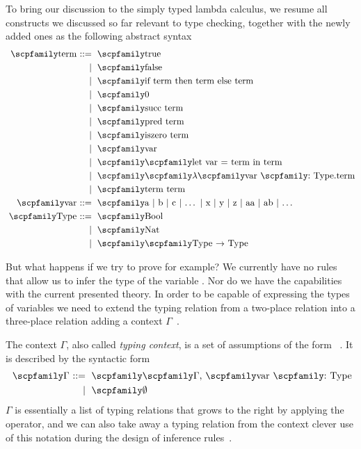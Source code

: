 \documentclass[
  oneside,
  english,
  coorientadorbanca,
  noabntexcite
]{ufsc-thesis-rn46-2019}
\def\bnfdef{::=}
\newcommand{\codett}[1]{\text{\scpfamily#1}}
\newcommand{\code}[1]{\text{\scpfamily\setlength\spaceskip{0.35em}#1}}
\newcommand{\bnfvar}[1]{\codett{#1}}
\newcommand{\bnfmore}[1]{            & \ & \mid{}    & \ \code{#1}}
\newcommand{\astprod}[2]{\code{#1} & \ & \bnfdef{} & \ \code{#2}}
\newcommand{\astmore}[1]{\bnfmore{#1}}
\newcommand{\typer}[2]{\code{#1 \codett{:} #2}}
\newcommand{\fnty}[2]{\code{#1 $\rightarrow$ #2}}
\newcommand{\fnabs}[3]{\code{$\lambda$\typer{#1}{#2}.#3}}
\newcommand{\astlet}[3]{\code{let #1 = #2 in #3}}
\begin{document}
To bring our discussion to the simply typed lambda calculus, we resume all constructs we discussed so far relevant to type checking, together with the newly added ones as the following abstract syntax
\begin{equation}~\label{eq:simply_typed_lc}
  \begin{alignedat}{2}
    \astprod{term}{true} \\
    \astmore{false} \\
    \astmore{if term then term else term} \\
    \astmore{0} \\
    \astmore{succ term} \\
    \astmore{pred term} \\
    \astmore{iszero term} \\
    \astmore{var} \\
    \astmore{\astlet{var}{term}{term}} \\
    \astmore{\fnabs{var}{Type}{term}} \\
    \astmore{term term} \\
    \astprod{var}{a $\mid$ b $\mid$ c $\mid$ $\dots$ $\mid$ x $\mid$ y $\mid$ z $\mid$ aa $\mid$ ab $\mid$ $\dots$} \\
    \astprod{Type}{Bool} \\
    \astmore{Nat} \\
    \astmore{\fnty{Type}{Type}}
  \end{alignedat}
\end{equation}

But what happens if we try to prove \typer{succ a}{Nat} for example?
We currently have no rules that allow us to infer the type of the variable \codett{a}.
Nor do we have the capabilities with the current presented theory.
In order to be capable of expressing the types of variables we need to extend the typing relation from a two-place relation into a three-place relation adding a context $\Gamma$~\cite{pierce2002types}.

The context $\Gamma$, also called \textit{typing context}, is a set of assumptions of the form \typer{var}{Type}~\cite{pierce2002types}.
It is described by the syntactic form
\begin{equation}~\label{eq:sample_term_ast_bool_g}
  \begin{alignedat}{2}
    \astprod{$\Gamma$}{\bnfvar{$\Gamma$}, \typer{var}{Type}} \\
    \bnfmore{$\emptyset$}
  \end{alignedat}
\end{equation}
$\Gamma$ is essentially a list of typing relations that grows to the right by applying the \code{,} operator, and we can also take away a typing relation from the context clever use of this notation during the design of inference rules~\cite{pierce2002types}.
\end{document}
